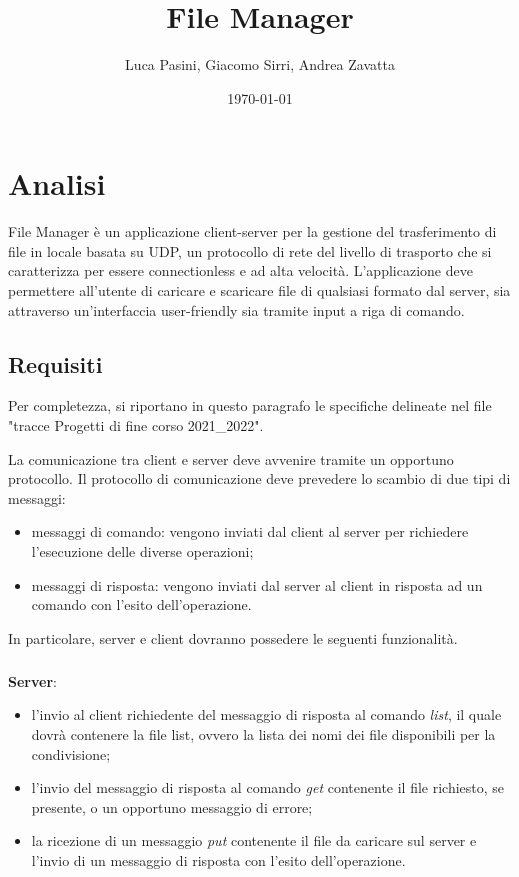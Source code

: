 \documentclass[a4paper,12pt]{report}
\title{File Manager}
\author{Luca Pasini, Giacomo Sirri, Andrea Zavatta}
\date{\today}
\begin{document}
\maketitle

\tableofcontents

\chapter{Analisi}

File Manager è un applicazione client-server per la gestione del trasferimento di file in locale basata su UDP, un protocollo di rete del livello di trasporto che si caratterizza per essere connectionless e ad alta velocità.
L'applicazione deve permettere all'utente di caricare e scaricare file di qualsiasi formato dal server, sia attraverso un'interfaccia user-friendly sia tramite input a riga di comando.

\section{Requisiti}
Per completezza, si riportano in questo paragrafo le specifiche delineate nel file "tracce Progetti di fine corso 2021\_2022".

La comunicazione tra client e server deve avvenire tramite un opportuno protocollo. Il protocollo di comunicazione deve prevedere lo scambio di due tipi di messaggi: 
\begin{itemize}
    \item messaggi di comando: vengono inviati dal client al server per richiedere l’esecuzione delle diverse operazioni;
    \item messaggi di risposta: vengono inviati dal server al client in risposta ad un comando con l’esito dell’operazione.
\end{itemize}
In particolare, server e client dovranno possedere le seguenti funzionalità.
\paragraph{}
\textbf{Server}:
\begin{itemize}
    \item l’invio al client richiedente del messaggio di risposta al comando \textit{list}, il quale dovrà contenere la file list, ovvero la lista dei nomi dei file disponibili per la condivisione;
    \item l’invio del messaggio di risposta al comando \textit{get} contenente il file richiesto, se presente, o un opportuno messaggio di errore;
    \item la ricezione di un messaggio \textit{put} contenente il file da caricare sul server e l’invio di un messaggio di risposta con l’esito dell’operazione.
\end{itemize}
\end{document}
